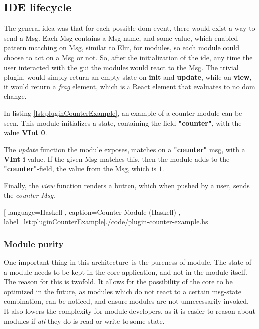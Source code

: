 \subsection{IDE lifecycle}

The general idea was that for each possible \gls{dom}-event, there would exist a
way to send a Msg. Each Msg contains a Msg name, and some value, which enabled
pattern matching on Msg, similar to Elm, for modules, so each module could
choose to act on a Msg or not. So, after the initialization of the \gls{ide},
any time the user interacted with the \gls{gui} the modules would react to the
Msg. The trivial plugin, would simply return an empty state on \textbf{init} and
\textbf{update}, while on \textbf{view}, it would return a \textit{frag}
element, which is a React element that evaluates to no \gls{dom} change.

In listing \ref{lst:pluginCounterExample}, an example of a counter module can be
seen. This module initializes a state, containing the field \textbf{"counter"},
with the value \textbf{VInt 0}.

The \textit{update} function the module exposes, matches on a \textbf{"counter"}
msg, with a \textbf{VInt i} value. If the given Msg matches this, then the
module adds to the \textbf{"counter"}-field, the value from the Msg, which is
$1$.

Finally, the \textit{view} function renders a button, which when pushed by a
user, sends the \textit{counter-Msg}.

\begin{center}
  
    [ language=Haskell
    , caption={Counter Module (Haskell)}
    , label=lst:pluginCounterExample]{./code/plugin-counter-example.hs}
\end{center}

\subsubsection{Module purity}

One important thing in this architecture, is the pureness of module. The state
of a module needs to be kept in the core application, and not in the module
itself. The reason for this is twofold. It allows for the possibility of the
core to be optimized in the future, as modules which do not react to a certain
msg-state combination, can be noticed, and ensure modules are not unnecessarily
invoked. It also lowers the complexity for module developers, as it is easier to
reason about modules if \textit{all} they do is read or write to some state.


